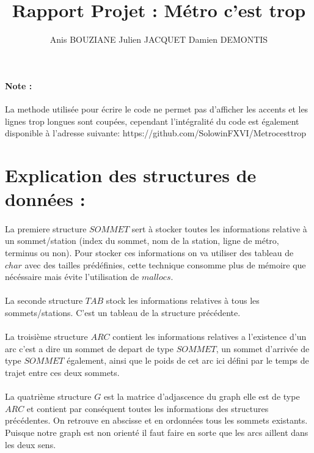 \documentclass[a4paper]{article}
\title {Rapport Projet : Métro c'est trop}
\author{Anis BOUZIANE Julien JACQUET Damien DEMONTIS}
\begin{document}
  \maketitle
  \newpage

\paragraph{Note :}
La methode utilisée pour écrire le code ne permet pas d'afficher les accents et les lignes trop longues sont coupées, cependant l'intégralité du code est également disponible à l'adresse suivante:
https://github.com/SolowinFXVI/Metrocesttrop

\section{Explication des structures de données :}
  \paragraph{}
  La premiere structure $SOMMET$ sert à stocker toutes les informations relative à un sommet/station (index du sommet, nom de la station, ligne de métro, terminus ou non).
  Pour stocker ces informations on va utiliser des tableau de $char$ avec des tailles prédéfinies, cette technique consomme plus de mémoire que nécéssaire mais évite l'utilisation de $mallocs$.
  \paragraph{}
  La seconde structure $TAB$ stock les informations relatives à tous les sommets/stations. C'est un tableau de la structure précédente.
  \paragraph{}
  La troisième structure $ARC$ contient les informations relatives a l'existence d'un arc c'est a dire un sommet de depart de type $SOMMET$, un sommet d'arrivée de type $SOMMET$ également, ainsi que le poids de cet arc ici défini par le temps de trajet entre ces deux sommets.
  \paragraph{}
  La quatrième structure $G$ est la matrice d'adjascence du graph elle est de type $ARC$ et contient par conséquent toutes les informations des structures précédentes. On retrouve en abscisse et en ordonnées tous les sommets existants. Puisque notre graph est non orienté il faut faire en sorte que les arcs aillent dans les deux sens.
\end{document}
